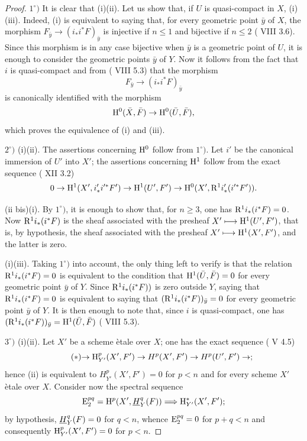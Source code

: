 \skpt
\begin{proof}
$1^\circ)$ It is clear that \textup{(i)}\SSI \textup{(ii)}.
Let us show that, if $U$ is quasi-compact in $X$, \textup{(i)}\SSI
\textup{(iii)}. Indeed, \textup{(i)} is equivalent to saying that, for
every geometric point $\bar{y}$ of $X$, the morphism
$F_{\bar{y}}\to (i_*i^*F)_{\bar{y}}$ is injective if $n\leq 1$ and
bijective if $n\leq 2$ ( VIII 3.6). Since this morphism is in
any case bijective when $\bar{y}$ is a geometric point of $U$, it is
enough to consider the geometric points $\bar{y}$ of $Y$. Now it
follows from the fact that $i$ is quasi-compact and from
( VIII 5.3) that the morphism
$$F_{\bar{y}}\to (i_*i^*F)_{\bar{y}}$$
is canonically identified with the morphism
$$
\mathrm H^0(\bar{X}, \bar{F})\to \mathrm H^0(\bar{U}, \bar{F}),
$$
which proves the equivalence of \textup{(i)} and \textup{(iii)}.

$2^\circ)$ \textup{(i)}\ALORS \textup{(ii)}. The assertions concerning $\mathrm H^0$ follow from $1^\circ)$. Let $i'$ be the canonical immersion of $U'$ into $X'$; the assertions concerning $\mathrm H^1$ follow from the exact sequence ( XII 3.2)
$$0\to \mathrm H^1(X', i'_*i'^*F')\to \mathrm H^1(U', F')\to \mathrm H^0(X', \mathrm R^1i'_*(i'^*F')).
$$

(ii bis)\ALORS \textup{(i)}\pageoriginale. By $1^\circ)$, it is enough to show that, for $n\geq 3$, one has $\mathrm R^1i_*(i^*F)=0$. Now $\mathrm R^1i_*(i^*F)$ is the sheaf associated with the presheaf $X'\longmapsto \mathrm H^1(U', F')$, that is, by hypothesis, the sheaf associated with the presheaf $X'\longmapsto \mathrm H^1(X', F')$, and the latter is zero.

\textup{(i)}\SSI \textup{(iii)}. Taking $1^\circ)$ into account, the only thing left to verify is that the relation $\mathrm R^1i_*(i^*F)=0$ is equivalent to the condition that $\mathrm H^1(\bar U, \bar F)=0$ for every geometric point $\bar y$ of $Y$. Since $\mathrm R^1i_*(i^*F))$ is zero outside $Y$, saying that $\mathrm R^1i_*(i^*F)=0$ is equivalent to saying that $(\mathrm R^1i_*(i^*F))_{\bar y}=0$ for every geometric point $\bar y$ of $Y$. It is then enough to note that, since $i$ is quasi-compact, one has $(\mathrm R^1i_*(i^*F))_{\bar y}=\mathrm H^1(\bar U, \bar F)$ ( VIII 5.3).

$3^\circ)$ \textup{(i)}\ALORS \textup{(ii)}. Let $X'$ be a scheme \`etale over $X$; one has the exact sequence ( V 4.5)
\begin{equation*} \label{eq:XIV.1.1.*} \tag{$*$} {\to \mathrm H^p_{Y'}(X', F')\to H^p(X', F')\to H^p(U', F')\to};
\end{equation*}
hence \textup{(ii)} is equivalent to $H^p_{Y'}(X', F')=0$ for $p<n$ and for every scheme $X'$ \`etale over $X$. Consider now the spectral sequence
$$
\operatorname{E}_2^{pq}=\mathrm H^p(X', {\mathop{\underline{H}}\nolimits}_Y^q(F))\Longrightarrow \mathrm H_{Y'}^*(X', F');$$
by hypothesis, ${\mathop{\underline{H}}\nolimits}_Y^q(F)=0$ for $q<n$, whence $\operatorname{E}_2^{pq}=0$ for $p+q<n$ and consequently $\mathrm H_{Y'}^p(X', F')=0$ for $p<n$.


\end{proof}
